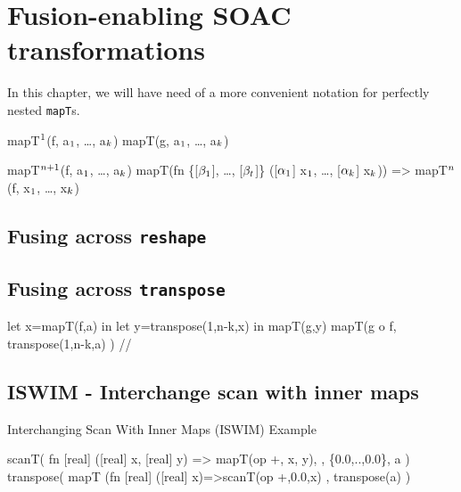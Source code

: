 \chapter{Fusion-enabling SOAC transformations}
\label{chap:fusion-enabling-soac-transformations}

In this chapter, we will have need of a more convenient notation for
perfectly nested \texttt{mapT}s.

\begin{colorcode}
mapT\(^{1}\)(f, a\(_{1}\), \ldots , a\(_{k}\)) \emphh{\(\equiv\)}
mapT(g, a\(_{1}\), \ldots, a\(_{k}\))

mapT\(^{n+1}\)(f, a\(_{1}\), \ldots, a\(_{k}\)) \emphh{\(\equiv\)}
mapT(fn \{[\(\beta_{1}\)], \ldots, [\(\beta_{t}\)]\} ([\(\alpha_{1}\)] x\(_{1}\), \ldots, [\(\alpha_{k}\)] x\(_{k}\))) =>
       mapT\(^{n}\)(f, x\(_{1}\), \ldots, x\(_{k}\))
\end{colorcode}

\section{Fusing across \texttt{reshape}}

\section{Fusing across \texttt{transpose}}

\begin{colorcode}
let x=mapT(f,a) in let y=transpose(1,n-k,x) in mapT(g,y)
        \emphh{\mymath{\equiv}}
mapT(g o f, transpose(1,n-k,a) ) 
// 
\end{colorcode}

\section{ISWIM - Interchange scan with inner maps}

Interchanging Scan With Inner Maps (ISWIM) Example

\begin{colorcode}
scanT( fn [real] ([real] x, [real] y) => mapT(op +, x, y), 
     , \{0.0,..,0.0\}, a )   \emphh{\mymath{\equiv}}
transpose( mapT (fn [real] ([real] x)=>scanT(op +,0.0,x)
                , transpose(a) )
\end{colorcode}

